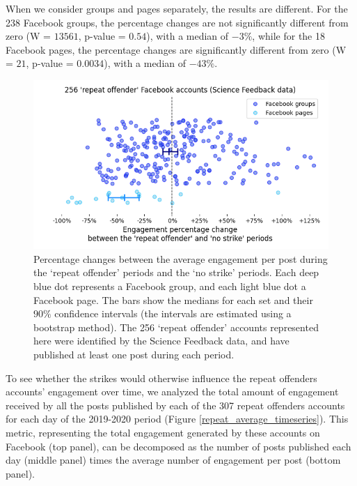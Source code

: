 \documentclass[review]{elsarticle}
\begin{document}
When we consider groups and pages separately, the results are different.
For the 238 Facebook groups, the percentage changes are not significantly different from zero (W = $13561$, p-value = $0.54$), with a median of $-3\%$, while for the 18 Facebook pages, the percentage changes are significantly different from zero (W = $21$, p-value = $0.0034$), with a median of $-43\%$.

\begin{figure}[!h]
\centering
\includegraphics[scale=0.5]{./../figure/sf_repeat_vs_free_percentage_change.png}
\caption{
Percentage changes between the average engagement per post during the `repeat offender' periods and the `no strike' periods.
Each deep blue dot represents a Facebook group, and each light blue dot a Facebook page.
The bars show the medians for each set and their $90\%$ confidence intervals (the intervals are estimated using a bootstrap method).
The 256 `repeat offender' accounts represented here were identified by the Science Feedback data, and have published at least one post during each period.
}
\label{repeat_vs_free_percentage_change}
\end{figure}

To see whether the strikes would otherwise influence the repeat offenders accounts' engagement over time, we analyzed the total amount of engagement received by all the posts published by each of the 307 repeat offenders accounts for each day of the 2019-2020 period (Figure \ref{repeat_average_timeseries}). 
This metric, representing the total engagement generated by these accounts on Facebook (top panel), can be decomposed as the number of posts published each day (middle panel) times the average number of engagement per post (bottom panel).
\end{document}
